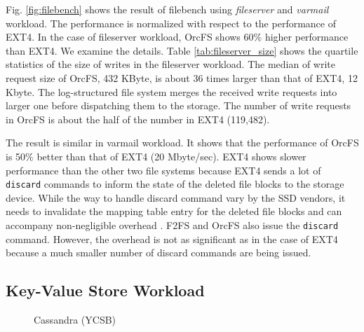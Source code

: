 \documentclass[prodmode,acmtecs]{acmsmall}
\begin{document}
Fig. \ref{fig:filebench} shows the result of filebench
\cite{filebench} using \emph{fileserver} and \emph{varmail} workload.
The performance is normalized with respect to the performance of EXT4.
In the case of fileserver workload, OrcFS shows 60$\%$ higher
performance than EXT4.  We examine the details. Table
\ref{tab:fileserver_size} shows the quartile statistics of the size of
writes in the fileserver workload.  The median of write request size
of OrcFS, 432 KByte, is about 36 times larger than that of EXT4, 12
Kbyte. The log-structured file system merges the received write
requests into larger one before dispatching them to the storage.  The
number of write requests in OrcFS is about the half of the number in
EXT4 (119,482).


The result is similar in varmail workload. It shows that the
performance of OrcFS is 50$\%$ better than that of EXT4 (20
Mbyte/sec). EXT4 shows slower performance than the other two file
systems because EXT4 sends a lot of \texttt{discard} commands to inform
the state of the deleted file blocks to the storage device. While the
way to handle discard command vary by the SSD vendors, it needs to
invalidate the mapping table entry for the deleted file blocks and can
accompany non-negligible overhead \cite{saxena2010flashvm}.  F2FS and
OrcFS also issue the \texttt{discard} command.
However, the overhead is not as significant as in the case of EXT4
because a much smaller number of discard commands are being issued.



\subsection{Key-Value Store Workload}
\label{subsec:ycsb_bench}

\begin{figure}[t]
  \centering
   \caption{Cassandra (YCSB)\label{fig:ycsb}}
\end{figure}
\end{document}
